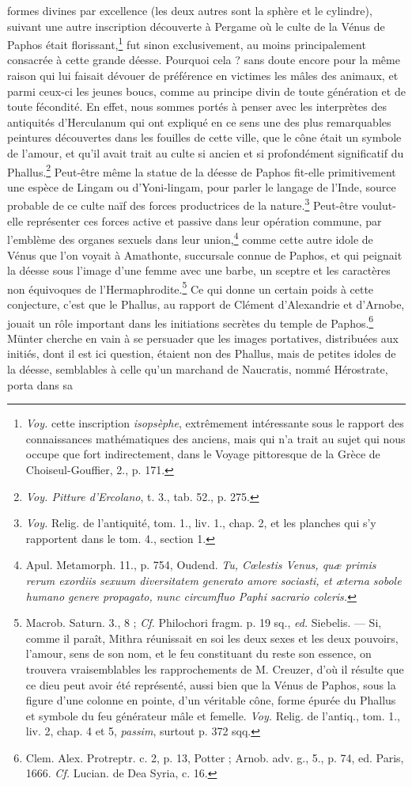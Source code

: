\documentclass[a4paper, 11pt, oneside, polutonikogreek, french]{article}
\begin{document}
formes divines par excellence (les deux autres sont la sphère et le cylindre), suivant une autre inscription découverte à Pergame où le culte de la Vénus de Paphos était florissant,\footnote{\emph{Voy.} cette inscription \emph{isopsèphe}, extrêmement intéressante sous le rapport des connaissances mathématiques des anciens, mais qui n'a trait au sujet qui nous occupe que fort indirectement, dans le Voyage pittoresque de la Grèce de Choiseul-Gouffier, 2., p. 171.} fut sinon exclusivement, au moins principalement consacrée à cette grande déesse. Pourquoi cela ? sans doute encore pour la même raison qui lui faisait dévouer de préférence en victimes les mâles des animaux, et parmi ceux-ci les jeunes boucs, comme au principe divin de toute génération et de toute fécondité. En effet, nous sommes portés à penser avec les interprètes des antiquités d'Herculanum qui ont expliqué en ce sens une des plus remarquables peintures découvertes dans les fouilles de cette ville, que le cône était un symbole de l'amour, et qu'il avait trait au culte si ancien et si profondément significatif du Phallus.\footnote{\emph{Voy. Pitture d'Ercolano}, t. 3., tab. 52., p. 275.} Peut-être même la statue de la déesse de Paphos fit-elle primitivement une espèce de Lingam ou d'Yoni-lingam, pour parler le langage de l'Inde, source probable de ce culte naïf des forces productrices de la nature.\footnote{\emph{Voy.} Relig. de l'antiquité, tom. 1., liv. 1., chap. 2, et les planches qui s'y rapportent dans le tom. 4., section 1.} Peut-être voulut-elle représenter ces forces active et passive dans leur opération commune, par l'emblème des organes sexuels dans leur union,\footnote{Apul. Metamorph. 11., p. 754, Oudend. \emph{Tu, Cœlestis Venus, quæ primis rerum exordiis sexuum diversitatem generato amore sociasti, et æterna sobole humano genere propagato, nunc circumfluo Paphi sacrario coleris.}} comme cette autre idole de Vénus que l'on voyait à Amathonte, succursale connue de Paphos, et qui peignait la déesse sous l'image d'une femme avec une barbe, un sceptre et les caractères non équivoques de l'Hermaphrodite.\footnote{Macrob. Saturn. 3., 8 ; \emph{Cf.} Philochori fragm. p. 19 sq., \emph{ed.} Siebelis. --- Si, comme il paraît, Mithra réunissait en soi les deux sexes et les deux pouvoirs, l'amour, sens de son nom, et le feu constituant du reste son essence, on trouvera vraisemblables les rapprochements de M. Creuzer, d'où il résulte que ce dieu peut avoir été représenté, aussi bien que la Vénus de Paphos, sous la figure d'une colonne en pointe, d'un véritable cône, forme épurée du Phallus et symbole du feu générateur mâle et femelle. \emph{Voy.} Relig. de l'antiq., tom. 1., liv. 2, chap. 4 et 5, \emph{passim}, surtout p. 372 sqq.} Ce qui donne un certain poids à cette conjecture, c'est que le Phallus, au rapport de Clément d'Alexandrie et d'Arnobe, jouait un rôle important dans les initiations secrètes du temple de Paphos.\footnote{Clem. Alex. Protreptr. c. 2, p. 13, Potter ; Arnob. adv. g., 5., p. 74, ed. Paris, 1666. \emph{Cf.} Lucian. de Dea Syria, c. 16.} Münter cherche en vain à se persuader que les images portatives, distribuées aux initiés, dont il est ici question, étaient non des Phallus, mais de petites idoles de la déesse, semblables à celle qu'un marchand de Naucratis, nommé Hérostrate, porta dans sa 
\end{document}
